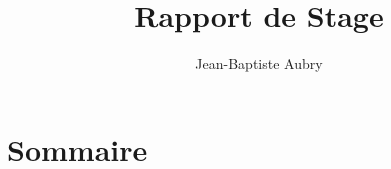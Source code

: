 \documentclass[a4paper, 11pt, frenchb]{article}
\title{Rapport de Stage}
\author{Jean-Baptiste Aubry}
\begin{document}
\maketitle

\pagebreak



\section*{Sommaire}






\appendix



\tableofcontents
\end{document}
